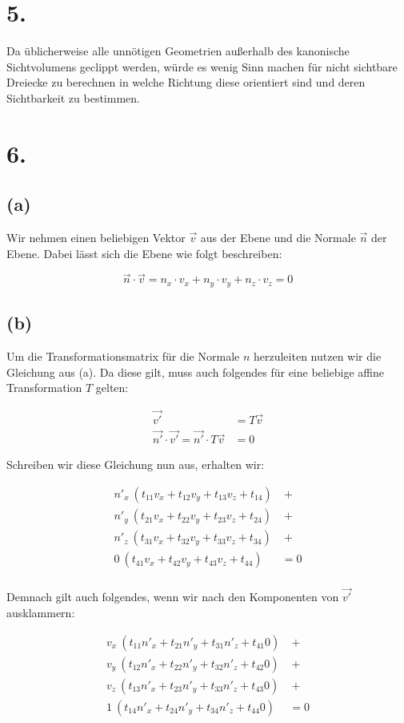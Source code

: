 \documentclass[12pt]{scrreprt}
\begin{document}
\section*{5.}
Da üblicherweise alle unnötigen Geometrien außerhalb des kanonische Sichtvolumens geclippt werden, würde es wenig Sinn machen für nicht sichtbare Dreiecke zu berechnen in welche Richtung diese orientiert sind und deren Sichtbarkeit zu bestimmen.
\section*{6.}
\subsection*{(a)}
Wir nehmen einen beliebigen Vektor $\vec{v}$ aus der Ebene und die Normale $\vec{n}$ der Ebene. Dabei lässt sich die Ebene wie folgt beschreiben:

\[
	\vec{n} \cdot \vec{v} = n_x \cdot v_x + n_y \cdot v_y + n_z \cdot v_z = 0
\] 
\subsection*{(b)}
Um die Transformationsmatrix für die Normale $n$ herzuleiten nutzen wir die Gleichung aus (a). Da diese gilt, muss auch folgendes für eine beliebige affine Transformation $T$ gelten:

\begin{align*}
	\vec{v'} &= T \vec{v}\\
	\vec{n'} \cdot \vec{v'} = \vec{n'} \cdot T \vec{v} &= 0 
\end{align*}

Schreiben wir diese Gleichung nun aus, erhalten wir:

\begin{align*}
	n'_x~ (t_{11} v_x + t_{12} v_y + t_{13} v_z + t_{14}) &~+\\
	n'_y~ (t_{21} v_x + t_{22} v_y + t_{23} v_z + t_{24}) &~+\\
	n'_z~ (t_{31} v_x + t_{32} v_y + t_{33} v_z + t_{34}) &~+\\
	0~ (t_{41} v_x + t_{42} v_y + t_{43} v_z + t_{44}) &= 0\\
\end{align*}

Demnach gilt auch folgendes, wenn wir nach den Komponenten von $\vec{v'}$ ausklammern:

\begin{align*}
	v_x~(t_{11} n'_x + t_{21} n'_y + t_{31} n'_z + t_{41} 0 ) &~+\\
	v_y~(t_{12} n'_x + t_{22} n'_y + t_{32} n'_z + t_{42} 0) &~+\\
	v_z~(t_{13} n'_x + t_{23} n'_y + t_{33} n'_z + t_{43} 0) &~+\\
	1~(t_{14} n'_x + t_{24} n'_y + t_{34} n'_z + t_{44} 0) &= 0
\end{align*}
\end{document}
